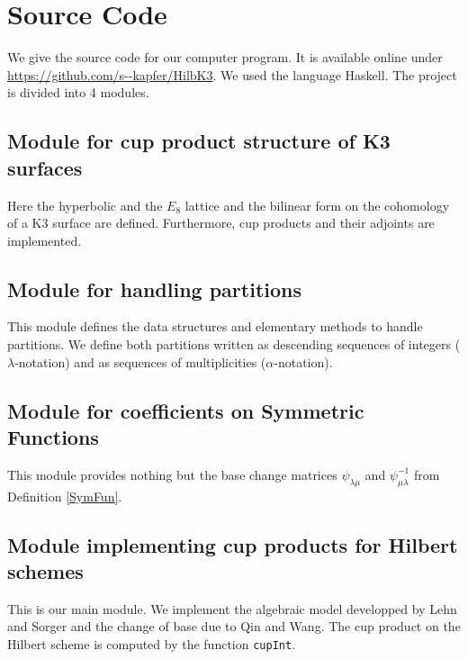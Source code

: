 \appendix
\section{Source Code}
We give the source code for our computer program. It is available online under \url{https://github.com/s--kapfer/HilbK3}. We used the language Haskell. The project is divided into 4 modules.
\subsection{Module for cup product structure of K3 surfaces} 
Here the hyperbolic and the $E_8$ lattice and the bilinear form on the cohomology of a K3 surface are defined. Furthermore, cup products and their adjoints are implemented.

\subsection{Module for handling partitions} 
This module defines the data structures and elementary methods to handle partitions. We define both partitions written as descending sequences of integers ($\lambda$-notation) and as sequences of multiplicities ($\alpha$-notation).

\subsection{Module for coefficients on Symmetric Functions} 
This module provides nothing but the base change matrices $\psi_{\lambda\mu}$ and $\psi^{-1}_{\mu\lambda}$ from Definition \ref{SymFun}.
 
\subsection{Module implementing cup products for Hilbert schemes} This is our main module. We implement the algebraic model developped by Lehn and Sorger and the change of base due to Qin and Wang. The cup product on the Hilbert scheme is computed by the function \texttt{cupInt}.

 
